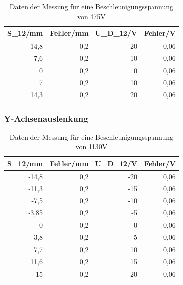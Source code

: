 \documentclass[12pt]{scrartcl}
\begin{document}
\begin{table}[htbp]
\caption{Daten der Messung für eine Beschleunigungsspannung von 475V}
\begin{center}
\begin{tabular}{|r|r|r|r|}
\hline
\multicolumn{1}{|l|}{S\_12/mm} & \multicolumn{1}{l|}{Fehler/mm} & \multicolumn{1}{l|}{U\_D\_12/V} & \multicolumn{1}{l|}{Fehler/V} \\ \hline
-14,8 & 0,2 & -20 & 0,06 \\ \hline
-7,6 & 0,2 & -10 & 0,06 \\ \hline
0 & 0,2 & 0 & 0,06 \\ \hline
7 & 0,2 & 10 & 0,06 \\ \hline
14,3 & 0,2 & 20 & 0,06 \\ \hline
\end{tabular}
\end{center}
\label{tab:materialeigenschaften}
\end{table}

\newpage

\subsubsection{Y-Achsenauslenkung}


\begin{table}[htbp]
\caption{Daten der Messung für eine Beschleunigungsspannung von 1130V}
\begin{center}
\begin{tabular}{|r|r|r|r|}
\hline
\multicolumn{1}{|l|}{S\_12/mm} & \multicolumn{1}{l|}{Fehler/mm} & \multicolumn{1}{l|}{U\_D\_12/V} & \multicolumn{1}{l|}{Fehler/V} \\ \hline
-14,8 & 0,2 & -20 & 0,06 \\ \hline
-11,3 & 0,2 & -15 & 0,06 \\ \hline
-7,5 & 0,2 & -10 & 0,06 \\ \hline
-3,85 & 0,2 & -5 & 0,06 \\ \hline
0 & 0,2 & 0 & 0,06 \\ \hline
3,8 & 0,2 & 5 & 0,06 \\ \hline
7,7 & 0,2 & 10 & 0,06 \\ \hline
11,6 & 0,2 & 15 & 0,06 \\ \hline
15 & 0,2 & 20 & 0,06 \\ \hline
\end{tabular}
\end{center}
\label{tab:materialeigenschaften}
\end{table}
\end{document}
